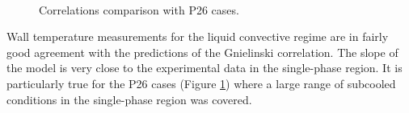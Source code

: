 \begin{figure}[h!]
\centering

\\

\caption{Correlations comparison with P26 cases.}
\label{fig:debora_tw_correl_P26}
\end{figure}


Wall temperature measurements for the liquid convective regime are in fairly good agreement with the predictions of the Gnielinski correlation. The slope of the model is very close to the experimental data in the single-phase region. It is particularly true for the P26 cases (Figure \ref{fig:debora_tw_correl_P26}) where a large range of subcooled conditions in the single-phase region was covered. 

